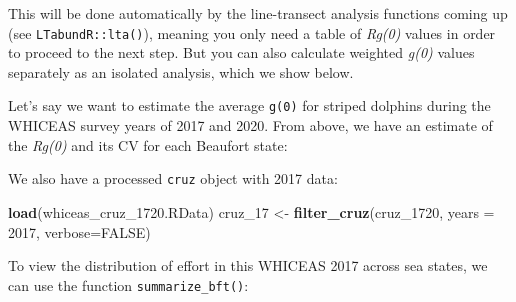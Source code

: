 \documentclass[
]{book}
\newenvironment{Shaded}{\begin{snugshade}}{\end{snugshade}}
\newcommand{\AttributeTok}[1]{\textcolor[rgb]{0.13,0.29,0.53}{#1}}
\newcommand{\ConstantTok}[1]{\textcolor[rgb]{0.56,0.35,0.01}{#1}}
\newcommand{\DecValTok}[1]{\textcolor[rgb]{0.00,0.00,0.81}{#1}}
\newcommand{\FloatTok}[1]{\textcolor[rgb]{0.00,0.00,0.81}{#1}}
\newcommand{\FunctionTok}[1]{\textcolor[rgb]{0.13,0.29,0.53}{\textbf{#1}}}
\newcommand{\NormalTok}[1]{#1}
\newcommand{\OtherTok}[1]{\textcolor[rgb]{0.56,0.35,0.01}{#1}}
\newcommand{\SpecialCharTok}[1]{\textcolor[rgb]{0.81,0.36,0.00}{\textbf{#1}}}
\newcommand{\StringTok}[1]{\textcolor[rgb]{0.31,0.60,0.02}{#1}}
\begin{document}
This will be done automatically by the line-transect analysis functions coming up (see \texttt{LTabundR::lta()}), meaning you only need a table of \emph{Rg(0)} values in order to proceed to the next step. But you can also calculate weighted \emph{g(0)} values separately as an isolated analysis, which we show below.

Let's say we want to estimate the average \texttt{g(0)} for striped dolphins during the WHICEAS survey years of 2017 and 2020. From above, we have an estimate of the \emph{Rg(0)} and its CV for each Beaufort state:

\begin{Shaded}
\end{Shaded}

We also have a processed \texttt{cruz} object with 2017 data:

\begin{Shaded}
\begin{Highlighting}[]
\FunctionTok{load}\NormalTok{(}\StringTok{\textquotesingle{}whiceas\_cruz\_1720.RData\textquotesingle{}}\NormalTok{)}
\NormalTok{cruz\_17 }\OtherTok{\textless{}{-}} \FunctionTok{filter\_cruz}\NormalTok{(cruz\_1720, }\AttributeTok{years =} \DecValTok{2017}\NormalTok{, }\AttributeTok{verbose=}\ConstantTok{FALSE}\NormalTok{)}
\end{Highlighting}
\end{Shaded}

To view the distribution of effort in this WHICEAS 2017 across sea states, we can use the function \texttt{summarize\_bft()}:
\end{document}
